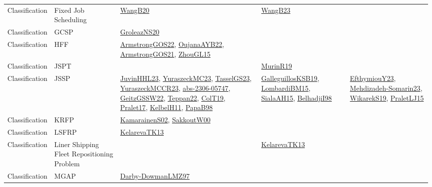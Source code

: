 {\begin{longtable}{lp{3cm}>{\raggedright}p{6cm}>{\raggedright}p{6cm}p{8cm}}
Classification & Fixed Job Scheduling & \href{papers/WangB20.pdf}{WangB20}\cite{WangB20} & \href{papers/WangB23.pdf}{WangB23}\cite{WangB23} & \\
Classification & GCSP & \href{papers/GroleazNS20.pdf}{GroleazNS20}\cite{GroleazNS20} &  & \\
Classification & HFF & \href{papers/ArmstrongGOS22.pdf}{ArmstrongGOS22}\cite{ArmstrongGOS22}, \href{papers/OujanaAYB22.pdf}{OujanaAYB22}\cite{OujanaAYB22}, \href{papers/ArmstrongGOS21.pdf}{ArmstrongGOS21}\cite{ArmstrongGOS21}, \href{papers/ZhouGL15.pdf}{ZhouGL15}\cite{ZhouGL15} &  & \\
Classification & JSPT &  & \href{papers/MurinR19.pdf}{MurinR19}\cite{MurinR19} & \\
Classification & JSSP & \href{papers/JuvinHHL23.pdf}{JuvinHHL23}\cite{JuvinHHL23}, \href{papers/YuraszeckMC23.pdf}{YuraszeckMC23}\cite{YuraszeckMC23}, \href{papers/TasselGS23.pdf}{TasselGS23}\cite{TasselGS23}, \href{articles/YuraszeckMCCR23.pdf}{YuraszeckMCCR23}\cite{YuraszeckMCCR23}, \href{articles/abs-2306-05747.pdf}{abs-2306-05747}\cite{abs-2306-05747}, \href{papers/GeitzGSSW22.pdf}{GeitzGSSW22}\cite{GeitzGSSW22}, \href{papers/Teppan22.pdf}{Teppan22}\cite{Teppan22}, \href{papers/ColT19.pdf}{ColT19}\cite{ColT19}, \href{papers/Pralet17.pdf}{Pralet17}\cite{Pralet17}, \href{articles/KelbelH11.pdf}{KelbelH11}\cite{KelbelH11}, \href{articles/PapaB98.pdf}{PapaB98}\cite{PapaB98} & \href{papers/GalleguillosKSB19.pdf}{GalleguillosKSB19}\cite{GalleguillosKSB19}, \href{papers/LombardiBM15.pdf}{LombardiBM15}\cite{LombardiBM15}, \href{papers/SialaAH15.pdf}{SialaAH15}\cite{SialaAH15}, \href{articles/BelhadjiI98.pdf}{BelhadjiI98}\cite{BelhadjiI98} & \href{papers/EfthymiouY23.pdf}{EfthymiouY23}\cite{EfthymiouY23}, \href{papers/Mehdizadeh-Somarin23.pdf}{Mehdizadeh-Somarin23}\cite{Mehdizadeh-Somarin23}, \href{articles/WikarekS19.pdf}{WikarekS19}\cite{WikarekS19}, \href{papers/PraletLJ15.pdf}{PraletLJ15}\cite{PraletLJ15}\\
Classification & KRFP & \href{papers/KamarainenS02.pdf}{KamarainenS02}\cite{KamarainenS02}, \href{articles/SakkoutW00.pdf}{SakkoutW00}\cite{SakkoutW00} &  & \\
Classification & LSFRP & \href{papers/KelarevaTK13.pdf}{KelarevaTK13}\cite{KelarevaTK13} &  & \\
Classification & Liner Shipping Fleet Repositioning Problem &  & \href{papers/KelarevaTK13.pdf}{KelarevaTK13}\cite{KelarevaTK13} & \\
Classification & MGAP & \href{articles/Darby-DowmanLMZ97.pdf}{Darby-DowmanLMZ97}\cite{Darby-DowmanLMZ97} &  & \\

\end{longtable}}
